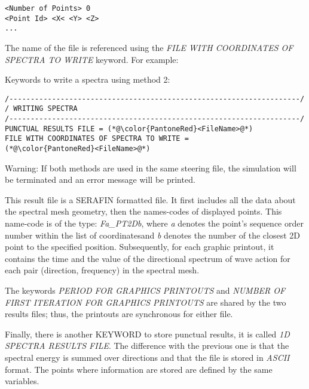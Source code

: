 \begin{enumerate}
\lstset{language=TelemacCas,
        basicstyle=\scriptsize\ttfamily}
\begin{lstlisting}[frame=trBL]
<Number of Points> 0
<Point Id> <X< <Y> <Z>
...
\end{lstlisting}

The name of the file is referenced using the \textit{FILE WITH COORDINATES OF SPECTRA
  TO WRITE} keyword.
For example:

\begin{CommentBlock}{Keywords to write a spectra using method 2:}
\lstset{language=TelemacCas,
        basicstyle=\scriptsize\ttfamily}
\begin{lstlisting}[frame=trBL]
/--------------------------------------------------------------------/
/ WRITING SPECTRA
/--------------------------------------------------------------------/
PUNCTUAL RESULTS FILE = (*@\color{PantoneRed}<FileName>@*)
FILE WITH COORDINATES OF SPECTRA TO WRITE =
(*@\color{PantoneRed}<FileName>@*)
\end{lstlisting}
\end{CommentBlock}


\end{enumerate}

\begin{WarningBlock}{Warning:}
  If both methods are used in the same steering file, the simulation will be terminated
  and an error message will be printed.
\end{WarningBlock}

This result file is a SERAFIN formatted file. It first includes all the data about the
spectral mesh geometry, then the names-codes of displayed points. This name-code is of
the type: \textit{Fa\_PT2Db}, where \textit{a} denotes the point's sequence order number
within the list of coordinatesand \textit{b} denotes the number of the closest 2D point
to the specified position. Subsequently, for each graphic printout, it contains the time
and the value of the directional spectrum of wave action for each pair (direction,
frequency) in the spectral mesh.

The keywords \textit{PERIOD FOR GRAPHICS PRINTOUTS }and \textit{NUMBER OF FIRST
  ITERATION FOR GRAPHICS PRINTOUTS}
are shared by the two results files; thus, the printouts are synchronous for either file.

Finally, there is another KEYWORD to store punctual results, it is called \textit{1D
  SPECTRA RESULTS FILE}. The difference with the previous one is that the spectral
energy is summed over directions and that the file is stored in \textit{ASCII} format.
The points where information are stored are defined by the same variables.


